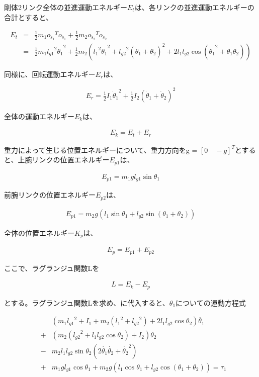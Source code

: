 剛体2リンク全体の並進運動エネルギー$E_{t}$は、各リンクの並進運動エネルギーの合計とすると、

\begin{eqnarray}
  E_{t}
  &=&\frac{1}{2}m_{1}o_{\dot{s}_{1}}{}^T\!o_{\dot{s}_{1}} + \frac{1}{2}m_{2}o_{\dot{s}_{2}}{}^T\!o_{\dot{s}_{2}} \nonumber \\
  &=&\frac{1}{2}m_{1}{l_{g1}}^2{\dot{\theta}_{1}}^2 + \frac{1}{2}m_{2}({{l_{1}}^2}{\dot{\theta}_{1}}^2 + {l_{g2}}^2(\dot{\theta}_{1} + \dot{\theta}_{2})^2 + 2{l_{1}}{l_{g2}}\cos({\dot{\theta}_{1}}^2 + \dot{\theta}_{1}\dot{\theta}_{2}))
\end{eqnarray}

同様に、回転運動エネルギー$E_{r}$は、

\begin{eqnarray}
  E_{r}
  =\frac{1}{2}I_{1}{\dot{\theta}_{1}}^2 + \frac{1}{2}I_{2}(\dot{\theta}_{1} + \dot{\theta}_{2})^2
\end{eqnarray}

全体の運動エネルギー$E_{k}$は、

\begin{eqnarray}
  E_{k}
  =E_{t} + E_{r}
\end{eqnarray}

重力によって生じる位置エネルギーについて、重力方向をg = ${[0 \quad -g]}^T$とすると、上腕リンクの位置エネルギー$E_{p1}$は、

\begin{eqnarray}
  E_{p1}
  =m_{1}gl_{g1}\sin\theta_{1}
\end{eqnarray}

前腕リンクの位置エネルギー$E_{p2}$は、

\begin{eqnarray}
  E_{p1}
  =m_{2}g(l_{1}\sin\theta_{1} + l_{g2}\sin(\theta_{1} + \theta_{2}))
\end{eqnarray}

全体の位置エネルギー$K_{p}$は、

\begin{eqnarray}
  E_{p}
  =E_{p1} + E_{p2}
\end{eqnarray}

ここで、ラグランジュ関数Lを

\begin{eqnarray}
  L
  =E_{k} - E_{p}
\end{eqnarray}

とする。ラグランジュ関数Lを求め、に代入すると、$\theta_{1}$についての運動方程式

\begin{eqnarray}
  &&(m_{1}{l_{g1}}^2 + I_{1} + m_{2}({l_{1}}^2 + {l_{g2}}^2)
  + 2l_{1}l_{g2}\cos\theta_{2})\ddot{\theta_{1}} \nonumber \\
  &+& (m_{2}({l_{g2}}^2 + l_{1}l_{g2}\cos\theta_{2}) + I_{2})\ddot{\theta_{2}} \nonumber \\
  &-& m_{2}l_{1}l_{g2}\sin\theta_{2}(2\dot{\theta_{1}}\dot{\theta_{2}} + {\dot{\theta_{2}}}^2)  \nonumber \\
  &+& m_{1}gl_{g1}\cos\theta_{1} + m_{2}g(l_{1}\cos\theta_{1} + l_{g2}\cos(\theta_{1} + \theta_{2})) = \tau_{1}
\end{eqnarray}

